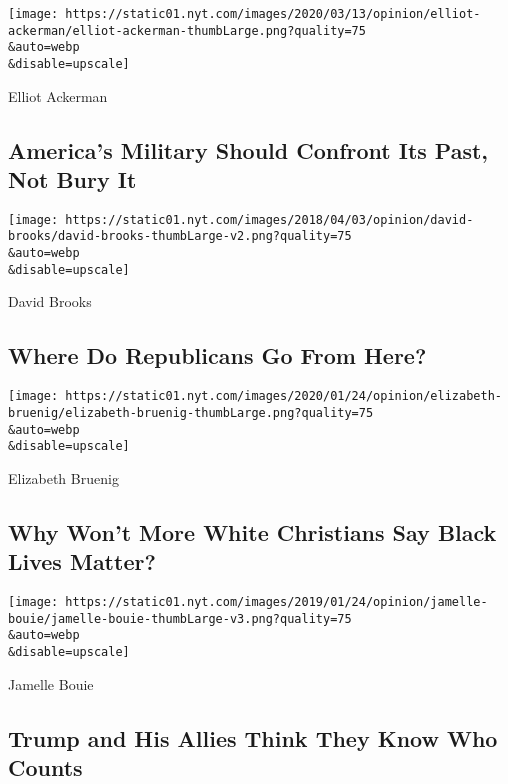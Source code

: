 \href{/2020/08/08/opinion/nazi-confederate-military-history-ksk.html}{}

\texttt{[image: https://static01.nyt.com/images/2020/03/13/opinion/elliot-ackerman/elliot-ackerman-thumbLarge.png?quality=75\\\&auto=webp\\\&disable=upscale]}

Elliot Ackerman

\hypertarget{americas-military-should-confront-its-past-not-bury-it}{%
\subsection{America's Military Should Confront Its Past, Not Bury
It}\label{americas-military-should-confront-its-past-not-bury-it}}

\href{/2020/08/07/opinion/sunday/republican-party-trump-2020.html}{}

\texttt{[image: https://static01.nyt.com/images/2018/04/03/opinion/david-brooks/david-brooks-thumbLarge-v2.png?quality=75\\\&auto=webp\\\&disable=upscale]}

David Brooks

\hypertarget{where-do-republicans-go-from-here}{%
\subsection{Where Do Republicans Go From
Here?}\label{where-do-republicans-go-from-here}}

\href{/2020/08/06/opinion/sunday/gloria-purvis-george-floyd-blm.html}{}

\texttt{[image: https://static01.nyt.com/images/2020/01/24/opinion/elizabeth-bruenig/elizabeth-bruenig-thumbLarge.png?quality=75\\\&auto=webp\\\&disable=upscale]}

Elizabeth Bruenig

\hypertarget{why-wont-more-white-christians-say-black-lives-matter}{%
\subsection{Why Won't More White Christians Say Black Lives
Matter?}\label{why-wont-more-white-christians-say-black-lives-matter}}

\href{/2020/08/07/opinion/trump-2020-census.html}{}

\texttt{[image: https://static01.nyt.com/images/2019/01/24/opinion/jamelle-bouie/jamelle-bouie-thumbLarge-v3.png?quality=75\\\&auto=webp\\\&disable=upscale]}

Jamelle Bouie

\hypertarget{trump-and-his-allies-think-they-know-who-counts}{%
\subsection{Trump and His Allies Think They Know Who
Counts}\label{trump-and-his-allies-think-they-know-who-counts}}

